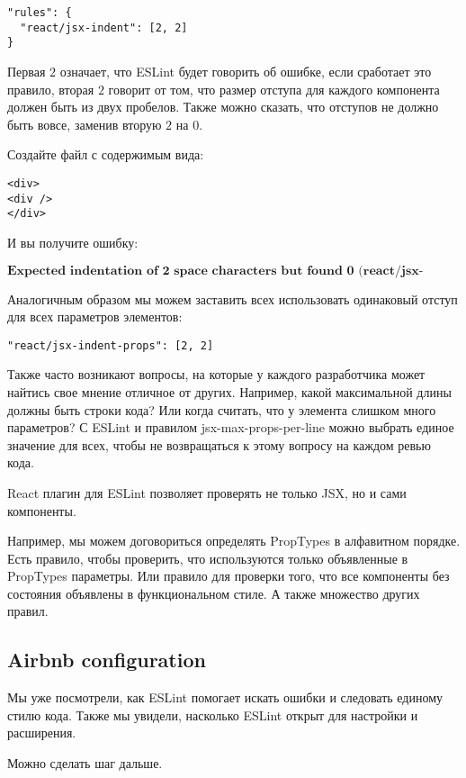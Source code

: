 \begin{lstlisting}
"rules": {
  "react/jsx-indent": [2, 2]
}
\end{lstlisting}

Первая $2$ означает, что ESLint будет говорить об ошибке, если сработает это правило, вторая $2$ говорит от том, что размер отступа для каждого компонента должен быть из двух пробелов. Также можно сказать, что отступов не должно быть вовсе, заменив вторую $2$ на $0$.

Создайте файл с содержимым вида:

\begin{lstlisting}
<div>
<div />
</div>
\end{lstlisting}

И вы получите ошибку:

$$
\textbf{Expected indentation of 2 space characters but found 0 (react/jsx-indent)}
$$

Аналогичным образом мы можем заставить всех использовать одинаковый отступ для всех параметров элементов:

\begin{lstlisting}
"react/jsx-indent-props": [2, 2]
\end{lstlisting}

Также часто возникают вопросы, на которые у каждого разработчика может найтись свое мнение отличное от других. Например, какой максимальной длины должны быть строки кода? Или когда считать, что у элемента слишком много параметров? С ESLint и правилом jsx-max-props-per-line можно выбрать единое значение для всех, чтобы не возвращаться к этому вопросу на каждом ревью кода.

React плагин для ESLint позволяет проверять не только JSX, но и сами компоненты. 

Например, мы можем договориться определять PropTypes в алфавитном порядке. Есть правило, чтобы проверить, что используются только объявленные в PropTypes параметры. Или правило для проверки того, что все компоненты без состояния объявлены в функциональном стиле. А также множество других правил.

\subsection{Airbnb configuration}

Мы уже посмотрели, как ESLint помогает искать ошибки и следовать единому стилю кода. Также мы увидели, насколько ESLint открыт для настройки и расширения.

Можно сделать шаг дальше.


